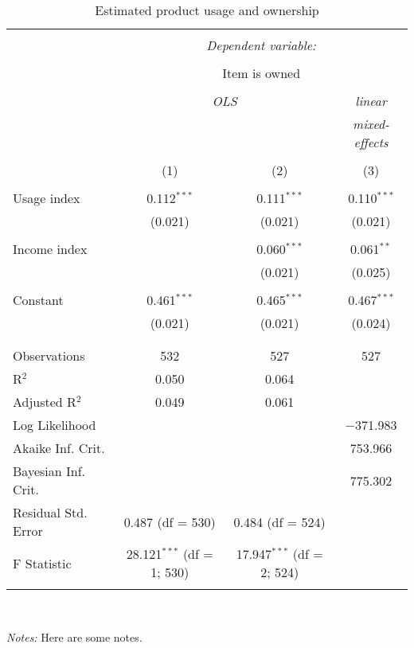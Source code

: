 
\begin{table}[!htbp] \centering 
  \caption{Estimated product usage and ownership} 
  \label{tab:ownership} 
\begin{tabular}{@{\extracolsep{5pt}}lccc} 
\\[-1.8ex]\hline 
\hline \\[-1.8ex] 
 & \multicolumn{3}{c}{\textit{Dependent variable:}} \\ 
\cline{2-4} 
\\[-1.8ex] & \multicolumn{3}{c}{Item is owned} \\ 
\\[-1.8ex] & \multicolumn{2}{c}{\textit{OLS}} & \textit{linear} \\ 
 & \multicolumn{2}{c}{\textit{}} & \textit{mixed-effects} \\ 
\\[-1.8ex] & (1) & (2) & (3)\\ 
\hline \\[-1.8ex] 
 Usage index & 0.112$^{***}$ & 0.111$^{***}$ & 0.110$^{***}$ \\ 
  & (0.021) & (0.021) & (0.021) \\ 
  & & & \\ 
 Income index &  & 0.060$^{***}$ & 0.061$^{**}$ \\ 
  &  & (0.021) & (0.025) \\ 
  & & & \\ 
 Constant & 0.461$^{***}$ & 0.465$^{***}$ & 0.467$^{***}$ \\ 
  & (0.021) & (0.021) & (0.024) \\ 
  & & & \\ 
\hline \\[-1.8ex] 
Observations & 532 & 527 & 527 \\ 
R$^{2}$ & 0.050 & 0.064 &  \\ 
Adjusted R$^{2}$ & 0.049 & 0.061 &  \\ 
Log Likelihood &  &  & $-$371.983 \\ 
Akaike Inf. Crit. &  &  & 753.966 \\ 
Bayesian Inf. Crit. &  &  & 775.302 \\ 
Residual Std. Error & 0.487 (df = 530) & 0.484 (df = 524) &  \\ 
F Statistic & 28.121$^{***}$ (df = 1; 530) & 17.947$^{***}$ (df = 2; 524) &  \\ 
\hline 
\hline \\[-1.8ex] 
\end{tabular}
\\
{\footnotesize 
\begin{minipage}{0.90 \linewidth}
 \emph{Notes:} Here are some notes.
\end{minipage}
}
\end{table}
